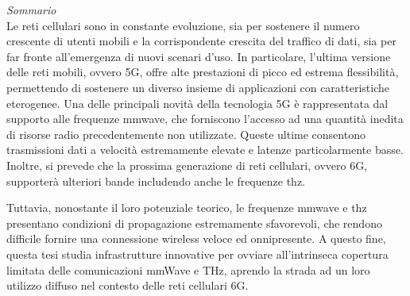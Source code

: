 {\noindent\huge\itshape Sommario}\\
%

Le reti cellulari sono in constante evoluzione, sia per sostenere il numero crescente di utenti mobili e la corrispondente crescita del traffico di dati, sia per far fronte all'emergenza di nuovi scenari d'uso.
In particolare, l'ultima versione delle reti mobili, ovvero 5G, offre alte prestazioni di picco ed estrema flessibilità, permettendo di sostenere un diverso insieme di applicazioni con caratteristiche eterogenee.
Una delle principali novità della tecnologia 5G è rappresentata dal supporto alle frequenze \gls{mmwave}, che forniscono l'accesso ad una quantità inedita di risorse radio precedentemente non utilizzate. Queste ultime consentono trasmissioni dati a velocità estremamente elevate e latenze particolarmente basse. 
Inoltre, si prevede che la prossima generazione di reti cellulari, ovvero 6G, supporterà ulteriori bande includendo anche le frequenze \gls{thz}.

Tuttavia, nonostante il loro potenziale teorico, le frequenze \gls{mmwave} e \gls{thz} presentano condizioni di propagazione estremamente sfavorevoli, che rendono difficile fornire una connessione wireless veloce ed onnipresente. 
A questo fine, questa tesi studia infrastrutture innovative per ovviare all'intrinseca copertura limitata delle comunicazioni mmWave e THz, aprendo la strada ad un loro utilizzo diffuso nel contesto delle reti cellulari 6G.

